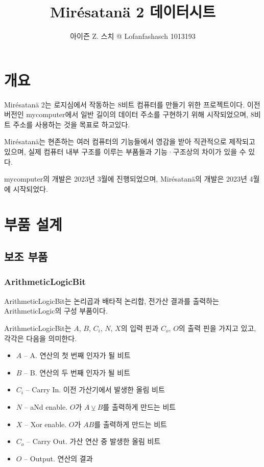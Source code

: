 \documentclass{article}
\title{Mirésatanä 2 데이터시트}
\author{아이즌 Z. 스치 @ Lofanfashasch 1013193}
\begin{document}
\maketitle
\tableofcontents

\pagebreak

\section{개요}

Mirésatanä 2는 로지심에서 작동하는 8비트 컴퓨터를 만들기 위한 프로젝트이다.
이전 버전인 mycomputer에서 일반 길이의 데이터 주소를 구현하기 위해 시작되었으며,
8비트 주소를 사용하는 것을 목표로 하고있다.

Mirésatanä는 현존하는 여러 컴퓨터의 기능들에서 영감을 받아
직관적으로 제작되고 있으며, 실제 컴퓨터 내부 구조를 이루는 부품들과
기능·구조상의 차이가 있을 수 있다.

mycomputer의 개발은 2023년 3월에 진행되었으며,
Mirésatanä의 개발은 2023년 4월에 시작되었다.

\section{부품 설계}

\subsection{보조 부품}

\subsubsection{ArithmeticLogicBit}

ArithmeticLogicBit는 논리곱과 배타적 논리합,
전가산 결과를 출력하는 ArithmeticLogic의 구성 부품이다.

ArithmeticLogicBit는
$A$, $B$, $C_i$, $N$, $X$의 입력 핀과
$C_o$, $O$의 출력 핀을 가지고 있고,
각각은 다음을 의미한다.

\begin{itemize}
    \item $A$ -- A. 연산의 첫 번째 인자가 될 비트
    \item $B$ -- B. 연산의 두 번째 인자가 될 비트
    \item $C_i$ -- Carry In. 이전 가산기에서 발생한 올림 비트
    \item $N$ -- aNd enable. $O$가 $A \veebar B$를 출력하게 만드는 비트
    \item $X$ -- Xor enable. $O$가 $AB$를 출력하게 만드는 비트
    \item $C_o$ -- Carry Out. 가산 연산 중 발생한 올림 비트
    \item $O$ -- Output. 연산의 결과
\end{itemize}
\end{document}
